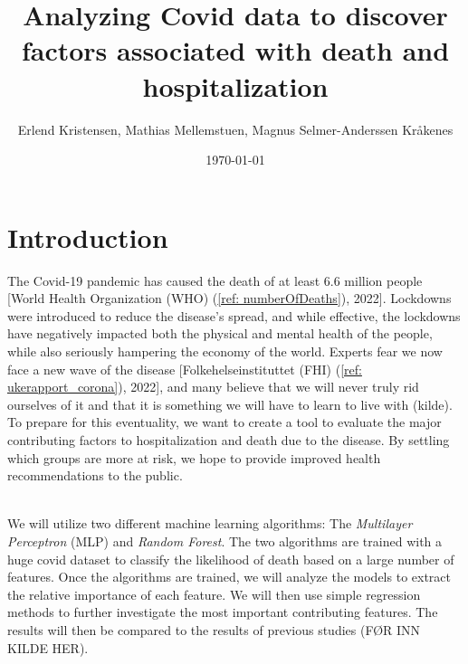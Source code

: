 \documentclass[english,notitlepage,reprint,nofootinbib]{revtex4-1}  %
\begin{document}
\title{Analyzing Covid data to discover factors associated with death and hospitalization}  %
\author{Erlend Kristensen, Mathias Mellemstuen, Magnus Selmer-Anderssen Kråkenes} %
\date{\today}      


\noaffiliation                            %

\begin{abstract}
    
\end{abstract}
\maketitle



\section{Introduction}
\label{sec:INTRODUCTION}
The Covid-19 pandemic has caused the death of at least 6.6 million people [World Health Organization (WHO) (\ref{ref: numberOfDeaths}), 2022]. Lockdowns were introduced to reduce the disease's spread, and while effective, the lockdowns have negatively impacted both the physical and mental health of the people, while also seriously hampering the economy of the world. Experts fear we now face a new wave of the disease [Folkehelseinstituttet (FHI) (\ref{ref: ukerapport_corona}), 2022], and many believe that we will never truly rid ourselves of it and that it is something we will have to learn to live with (kilde). 
To prepare for this eventuality, we want to create a tool to evaluate the major contributing factors to hospitalization and death due to the disease. By settling which groups are more at risk, we hope to provide improved health recommendations to the public. 

\\
 We will utilize two different machine learning algorithms: The \textit{Multilayer Perceptron} (MLP) and \textit{Random Forest}. The two algorithms are trained with a huge covid dataset to classify the likelihood of death based on a large number of features. Once the algorithms are trained, we will analyze the models to extract the relative importance of each feature. We will then use simple regression methods to further investigate the most important contributing features. The results will then be compared to the results of previous studies (FØR INN KILDE HER). 
 
\end{document}
